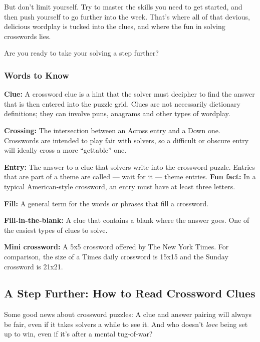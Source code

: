 But don't limit yourself. Try to master the skills you need to get
started, and then push yourself to go further into the week. That's
where all of that devious, delicious wordplay is tucked into the clues,
and where the fun in solving crosswords lies.

Are you ready to take your solving a step further?

\hypertarget{words-to-know}{%
\subsubsection{Words to Know}\label{words-to-know}}

\textbf{Clue:} A crossword clue is a hint that the solver must decipher
to find the answer that is then entered into the puzzle grid. Clues are
not necessarily dictionary definitions; they can involve puns, anagrams
and other types of wordplay.~

\textbf{Crossing:} The intersection between an Across entry and a Down
one. Crosswords are intended to play fair with solvers, so a difficult
or obscure entry will ideally cross a more ``gettable'' one.

\textbf{Entry:} The answer to a clue that solvers write into the
crossword puzzle. Entries that are part of a theme are called --- wait
for it --- theme entries. \textbf{Fun fact:} In a typical American-style
crossword, an entry must have at least three letters.

\textbf{Fill:} A general term for the words or phrases that fill a
crossword. ~

\textbf{Fill-in-the-blank:} A clue that contains a blank where the
answer goes. One of the easiest types of clues to solve.~

\textbf{Mini crossword:} A 5x5 crossword offered by The New York Times.
For comparison, the size of a Times daily crossword is 15x15 and the
Sunday crossword is 21x21.

\hypertarget{a-step-further-how-to-read-crossword-clues}{%
\subsection{A Step Further: How to Read Crossword
Clues}\label{a-step-further-how-to-read-crossword-clues}}

Some good news about crossword puzzles: A clue and answer pairing will
always be fair, even if it takes solvers a while to see it. And who
doesn't \emph{love} being set up to win, even if it's after a mental
tug-of-war?

